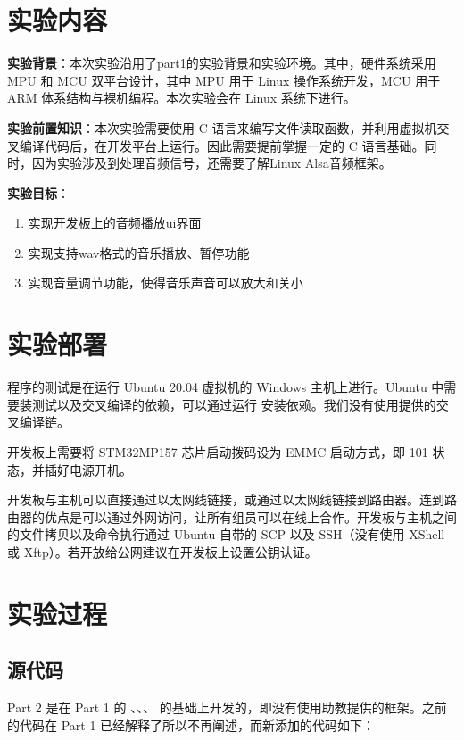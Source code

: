 
\section{实验内容}

\textbf{实验背景}：本次实验沿用了part1的实验背景和实验环境。其中，硬件系统采用 MPU 和 MCU 双平台设计，其中 MPU 用于 Linux 操作系统开发，MCU 用于 ARM 体系结构与裸机编程。本次实验会在 Linux 系统下进行。

\textbf{实验前置知识}：本次实验需要使用 C 语言来编写文件读取函数，并利用虚拟机交叉编译代码后，在开发平台上运行。因此需要提前掌握一定的 C 语言基础。同时，因为实验涉及到处理音频信号，还需要了解Linux Alsa音频框架。

\textbf{实验目标}：

\begin{enumerate}
    \item 实现开发板上的音频播放ui界面
    \item 实现支持wav格式的音乐播放、暂停功能
    \item 实现音量调节功能，使得音乐声音可以放大和关小
\end{enumerate}

\section{实验部署}

程序的测试是在运行 Ubuntu 20.04 虚拟机的 Windows 主机上进行。Ubuntu 中需要装测试以及交叉编译的依赖，可以通过运行  安装依赖。我们没有使用提供的交叉编译链。

开发板上需要将 STM32MP157 芯片启动拨码设为 EMMC 启动方式，即 101 状态，并插好电源开机。

开发板与主机可以直接通过以太网线链接，或通过以太网线链接到路由器。连到路由器的优点是可以通过外网访问，让所有组员可以在线上合作。开发板与主机之间的文件拷贝以及命令执行通过 Ubuntu 自带的 SCP 以及 SSH（没有使用 XShell 或 Xftp）。若开放给公网建议在开发板上设置公钥认证。

\section{实验过程}

\subsection{源代码}


Part 2 是在 Part 1 的 、、、 的基础上开发的，即没有使用助教提供的框架。之前的代码在 Part 1 已经解释了所以不再阐述，而新添加的代码如下：

